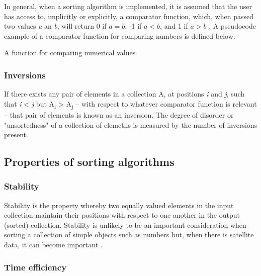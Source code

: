 \documentclass[12pt, a4paper]{article}
\begin{document}
In general, when a sorting algorithm is implemented, it is assumed that the user has access to, implicitly or explicitly, a comparator function, which, when passed two values \emph{a} an \emph{b}, will return 0 if $a = b$, -1 if $a < b$, and 1 if $a > b$ \autocite[55]{heineman2016algorithms}. A pseudocode example of a comparator function for comparing numbers is defined below.

\begin{algorithm}
    \caption{A function for comparing numerical values}\label{euclid}
    \begin{algorithmic}[1]
     
    \EndIf
     
    \EndIf
     
    \EndIf
    \EndProcedure
    \end{algorithmic}
\end{algorithm}

\subsubsection{Inversions}

If there exists any pair of elements in a collection A, at positions \emph{i} and \emph{j}, such that \emph{i} < \emph{j} but A\textsubscript{i} > A\textsubscript{j} -- with respect to whatever comparator function is relevant -- that pair of elements is known as an inversion. The degree of disorder or "unsortedness" of a collection of elemetns is measured by the number of inversions present.
\subsection{Properties of sorting algorithms}

\subsubsection{Stability}

Stability is the property whereby two equally valued elements in the input collection maintain their positions with respect to one another in the output (sorted) collection. Stability is unlikely to be an important consideration when sorting a collection of simple objects such as numbers but, when there is satellite data, it can become important \autocite{cormen01}.

\subsubsection{Time efficiency}
\end{document}
